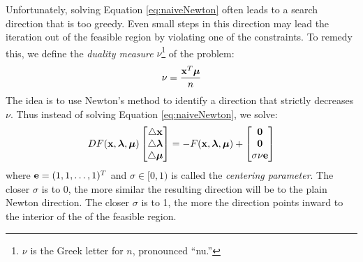  %

Unfortunately, solving Equation \ref{eq:naiveNewton} often leads to a search direction that is too greedy.
Even small steps in this direction may lead the iteration out of the feasible region by violating one of the constraints.
To remedy this, we define the \emph{duality measure} $\nu$\footnote{$\nu$ is the Greek letter for $n$, pronounced ``nu.''} of the problem: \[\nu = \frac{\mathbf{x}^T\boldsymbol{\mu}}{n} \]
The idea is to use Newton's method to identify a direction that strictly decreases $\nu$.
Thus instead of solving Equation \ref{eq:naiveNewton}, we solve:
\begin{align}
DF(\mathbf{x},\boldsymbol{\lambda},\boldsymbol{\mu})
\begin{bmatrix}\triangle \mathbf{x}\\ \triangle \boldsymbol{\lambda}\\ \triangle \boldsymbol{\mu}\end{bmatrix}
= - F(\mathbf{x},\boldsymbol{\lambda},\boldsymbol{\mu}) +
\begin{bmatrix} \mathbf{0} \\ \mathbf{0} \\ \sigma\nu\mathbf{e} \end{bmatrix}
\label{eq:newNewton}
\end{align}
where $\mathbf{e} = (1,1,\ldots,1)^T$ and $\sigma \in [0,1)$ is called the \emph{centering parameter}.
The closer $\sigma$ is to 0, the more similar the resulting direction will be to the plain Newton direction.
The closer $\sigma$ is to 1, the more the direction points inward to the interior of the of the feasible region.

